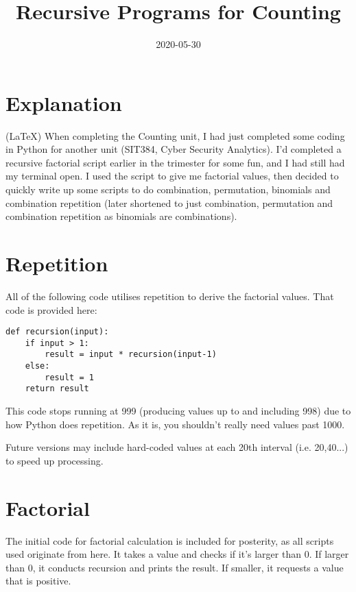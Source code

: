 \documentclass{article}
\title{Recursive Programs for Counting}
\date{2020-05-30}
\begin{document}
	\maketitle
	\newpage
	\tableofcontents
	\newpage
	
	\section{Explanation}
	
	(LaTeX)
	When completing the Counting unit, I had just completed some coding in Python for another unit
	(SIT384, Cyber Security Analytics). I'd completed a recursive factorial script earlier in the trimester
	for some fun, and I had still had my terminal open. I used the script to give me factorial values, then
	decided to quickly write up some scripts to do combination, permutation, binomials and combination repetition
	(later shortened to just combination, permutation and combination repetition as binomials are combinations).
	
	\section{Repetition}
	
	All of the following code utilises repetition to derive the factorial values.
	That code is provided here:
	
	\begin{verbatim}
def recursion(input):
	if input > 1:
		result = input * recursion(input-1)
	else:
		result = 1
	return result
	\end{verbatim}
	
	This code stops running at 999 (producing values up to and including 998) due to
	how Python does repetition. As it is, you shouldn't really need values past 1000.
	
	Future versions may include hard-coded values at each 20th interval (i.e. 20,40...)
	to speed up processing.
	
	\section{Factorial}
	
	The initial code for factorial calculation is included for posterity, as all scripts used originate from here.
	It takes a value and checks if it's larger than 0. If larger than 0,
	it conducts recursion and prints the result. If smaller, it requests a value that is positive.
	
\end{document}
